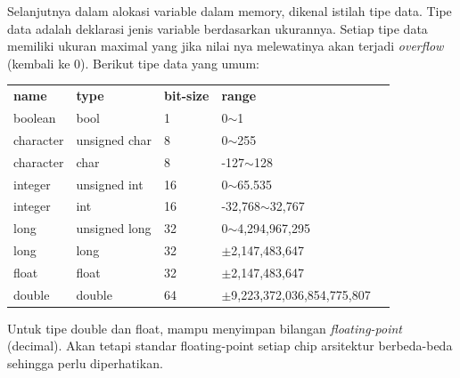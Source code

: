 \documentclass[12pt,]{article}
\begin{document}
	Selanjutnya dalam alokasi variable dalam memory, dikenal istilah tipe data.
	Tipe data adalah deklarasi jenis variable berdasarkan ukurannya.
	Setiap tipe data memiliki ukuran maximal yang jika nilai nya melewatinya akan terjadi \textit{overflow} (kembali ke 0).
	Berikut tipe data yang umum:
	\begin{table}[H]
		\begin{tabular}{|l|l|l|l|l}
			\cline{1-4}
			\textbf{name}      & \textbf{type}          & \textbf{bit-size} & \textbf{range}         &  \\ \cline{1-4}
			boolean   & bool          & 1  & 0$\sim$1             &  \\ \cline{1-4}
			character & unsigned char & 8  & 0$\sim$255           &  \\ \cline{1-4}
			character & char          & 8  & -127$\sim$128        &  \\ \cline{1-4}
			integer   & unsigned int  & 16 & 0$\sim$65.535        &  \\ \cline{1-4}
			integer   & int  		  & 16 & -32,768$\sim$32,767  &  \\ \cline{1-4}
			long	  & unsigned long & 32 & 0$\sim$4,294,967,295 &  \\ \cline{1-4}
			long	  & long 		  & 32 & $\pm$2,147,483,647	  &  \\ \cline{1-4}
			float	  & float 		  & 32 & $\pm$2,147,483,647	  &  \\ \cline{1-4}
			double	  & double 		  & 64 & $\pm$9,223,372,036,854,775,807	&  \\ \cline{1-4}
		\end{tabular}
	\end{table}
	Untuk tipe double dan float, mampu menyimpan bilangan \textit{floating-point} (decimal).
	Akan tetapi standar floating-point setiap chip arsitektur berbeda-beda sehingga perlu diperhatikan.
	
\end{document}
